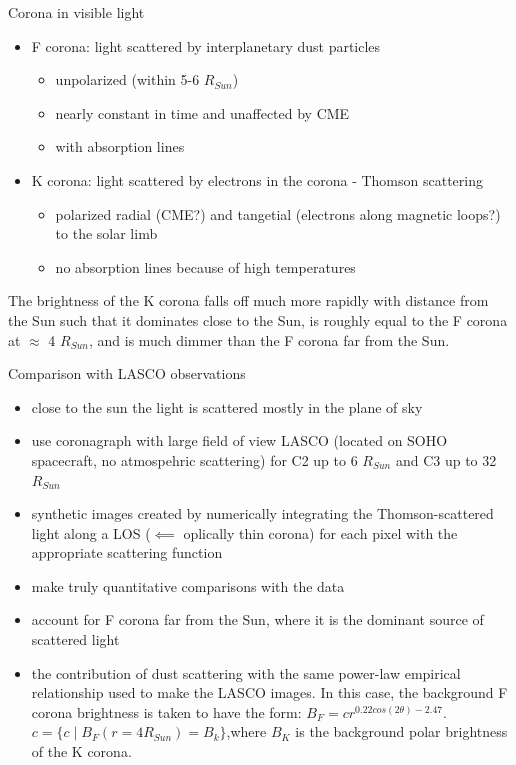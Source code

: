 \documentclass{beamer}
\begin{document}
\begin{frame}{Corona in visible light}

\begin{itemize}
\item F corona: light scattered by interplanetary dust particles 
\begin{itemize}
\item unpolarized (within 5-6 $R_{Sun}$)
\item  nearly constant in time and unaffected by CME
\item with absorption lines
\end{itemize}
\item K corona: light scattered by electrons in the corona - Thomson scattering 
\begin{itemize}
\item polarized radial (CME?) and tangetial (electrons along magnetic loops?) to the solar limb
\item no absorption lines because of high temperatures
\end{itemize}

\end{itemize}

The brightness of the K corona falls off much more
rapidly with distance from the Sun such that it dominates close to
the Sun, is roughly equal to the F corona at $\approx$ 4 $R_{Sun}$, and is much
dimmer than the F corona far from the Sun. 


\end{frame}



\begin{frame}{Comparison with LASCO observations}

\begin{itemize}
\item close to the sun the light is scattered mostly in the plane of sky
\item use coronagraph with large field of view LASCO (located on SOHO  spacecraft, no atmospehric scattering) for  C2 up to 6 $R_{Sun}$ and C3 up to 32 $R_{Sun}$
\item  synthetic images created by numerically
integrating the Thomson-scattered light along a LOS ($\impliedby$ oplically thin corona) for each
pixel with the appropriate scattering function
\item make truly quantitative comparisons with the data
\item account for F corona far
from the Sun, where it is the dominant source of scattered light
\item the contribution of dust scattering with the
same power-law empirical relationship used to make the LASCO
images. In this case, the background F corona brightness is taken
to have the form: $B_F = c r^{0.22 cos(2\theta) - 2.47} $. 
$c = \{c \mid B_F(r = 4 R_{Sun}) = B_k  \}$,where  $B_K$ is the background polar brightness of
the K corona.

\end{itemize}

\end{frame}
\end{document}

